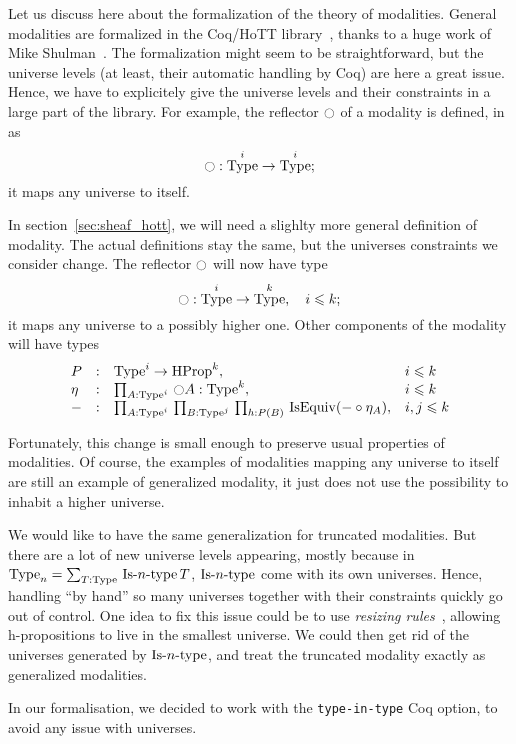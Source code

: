\documentclass[notfinal]{jfrarticle}
\DeclareMathOperator{\Type}{Type}
\DeclareMathOperator{\HProp}{HProp}
\DeclareMathOperator{\IsEquiv}{IsEquiv}
\def\mymathhyphen{{\hbox{-}}}
\newcommand{\IsType}[1]
{\mathop{\mathrm{Is\mymathhyphen}#1\mathrm{\mymathhyphen type}} }
\newcommand{\modal}{\ensuremath{\ocircle}}
\newcommand{\sumD}[3]{\sum_{#1:#2}\, #3}
\newcommand{\prodD}[3]{\prod_{#1:#2}\, #3}
\newcommand{\code}[1]{\texttt{#1}}
\begin{document}
Let us discuss here about the formalization of the theory of
modalities. General modalities are formalized in the Coq/HoTT
library~\cite{hottlib}, thanks to a huge work of Mike
Shulman~\cite{modules-modalities}. The formalization might seem to be
straightforward, but the universe levels (at least, their automatic
handling by Coq) are here a great issue. Hence, we have to explicitely
give the universe levels and their constraints in a large part of the
library. For example, the reflector $\modal$ of a modality is defined,
in~\cite{hottlib} as
\[ \modal : \Type^i \to \Type^i ;\]
it maps any universe to itself.

In section~\ref{sec:sheaf_hott}, we will need a slighlty more general
definition of modality. The actual definitions stay the same, but the
universes constraints we consider change. The reflector $\modal$ will
now have type
\[ \modal : \Type^i \to \Type^k,\quad i \leqslant k ;\]
it maps any universe to a possibly higher one.
Other components of the modality will have types
\[\begin{array}{llll}
  P &:& \Type^i \to \HProp^k, & i\leqslant k \\
  \eta &:& \prodD A {\Type^i} {\modal A : \Type^{k}}, & i \leqslant k\\
  - &:& \prodD A {\Type^i} {
          \prodD B {\Type^j} {
          \prodD h {P(B)} {
          \IsEquiv ( - \circ \eta_A)
          }}}, & i,j \leqslant k
\end{array}\]

Fortunately, this change is small enough to preserve usual properties of
modalities. Of course, the examples of modalities mapping
any universe to itself are still an example of generalized modality,
it just does not use the possibility to inhabit a higher
universe. 

We would like to have the same generalization for truncated
modalities. But there are a lot of new universe levels appearing,
mostly because in $\Type_n = \sumD T \Type {\IsType n T}$, $\IsType n$
come with its own universes. Hence, handling ``by hand'' so many
universes together with their constraints quickly go out of
control. One idea to fix this issue could be to use {\em resizing
  rules}~\cite{vv-resizing}, allowing h-propositions to live in the
smallest universe. We could then get rid of the universes generated by
$\IsType n$, and treat the truncated modality exactly as generalized
modalities.

In our formalisation, we decided to work with the \code{type-in-type}
Coq option, to avoid any issue with universes.
\end{document}
